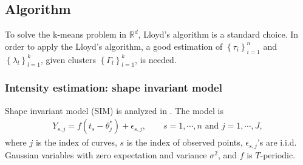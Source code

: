 	\subsection{Algorithm}
		To solve the k-means problem in $\mathbb{R}^d$, Lloyd's algorithm \cite{Lloyd1982} is a standard choice.
		In order to apply the Lloyd's algorithm, a good estimation of $\left\{ \tau_i \right\}_{i=1}^n$ and $ \left\{ \lambda_l \right\}_{l=1}^k $, given clusters $\left\{ \Gamma_l \right\}_{l=1}^k$, is needed. 

		\subsubsection*{Intensity estimation: shape invariant model}
			Shape invariant model (SIM) is analyzed in \cite{Bontemps2014,Bigot2013,Ronn2009,Gervini2005,Vimond2010,Gamboa2007,JeremieBigot2010,Wang1997}. The model is
			\begin{align*}
			Y_{s,j}=f(t_s- \theta_j^*)+\epsilon_{s,j}, \qquad s = 1,\cdots,n \text{ and }j=1,\cdots,J,
			\end{align*}
			where $j$ is the index of curves, $s$ is the index of observed points, $\epsilon_{s,j}$'s are i.i.d. Gaussian variables with zero expectation and variance $\sigma^2$, and $f$ is $T$-periodic.

